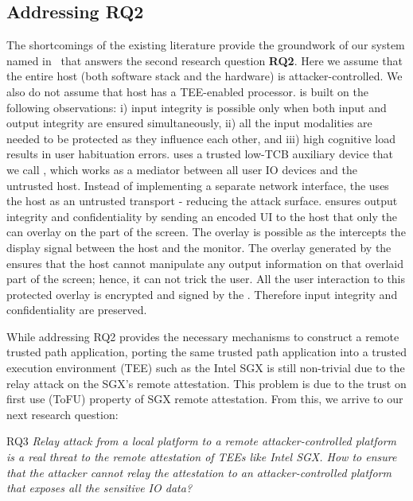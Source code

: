     \subsection{Addressing RQ2}
The shortcomings of the existing literature provide the groundwork of our system named \protection in~ that answers the second research question \textbf{RQ2}. Here we assume that the entire host (both software stack and the hardware) is attacker-controlled. We also do not assume that host has a TEE-enabled processor. \protection is built on the following observations: i) input integrity is possible only when both input and output integrity are ensured simultaneously, ii) all the input modalities are needed to be protected as they influence each other, and iii) high cognitive load results in user habituation errors. \protection uses a trusted low-TCB auxiliary device that we call \deviceprotection, which works as a mediator between all user IO devices and the untrusted host. Instead of implementing a separate network interface, the \deviceprotection uses the host as an untrusted transport - reducing the attack surface. \protection ensures output integrity and confidentiality by sending an encoded UI to the host that only the \deviceprotection can overlay on the part of the screen. The overlay is possible as the \deviceprotection intercepts the display signal between the host and the monitor. The overlay generated by the \deviceprotection ensures that the host cannot manipulate any output information on that overlaid part of the screen; hence, it can not trick the user. All the user interaction to this protected overlay is encrypted and signed by the \deviceprotection. Therefore input integrity and confidentiality are preserved.


While addressing RQ2 provides the necessary mechanisms to construct a remote trusted path application, porting the same trusted path application into a trusted execution environment (TEE) such as the Intel SGX is still non-trivial due to the relay attack on the SGX's remote attestation. This problem is due to the trust on first use (ToFU) property of SGX remote attestation. From this, we arrive to our next research question: 

\begin{mybox}[colback=white]{RQ3}
\emph{Relay attack from a local platform to a remote attacker-controlled platform is a real threat to the remote attestation of TEEs like Intel SGX. How to ensure that the attacker cannot relay the attestation to an attacker-controlled platform that exposes all the sensitive IO data?}
\end{mybox}

